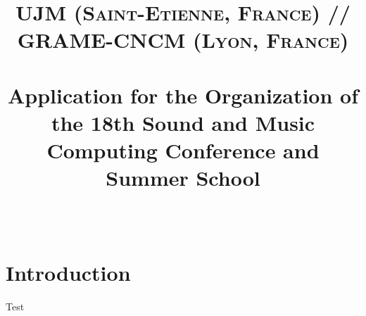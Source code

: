\documentclass[fontsize=12pt]{scrartcl} %
\title{	
\normalfont \normalsize 
\textsc{UJM (Saint-Etienne, France) // GRAME-CNCM (Lyon, France)} \\ [25pt] %
\horrule{0.5pt} \\[0.4cm] %
\huge Application for the Organization of the 18th Sound and Music Computing Conference and Summer School \\ %
\horrule{2pt} \\[0.5cm] %
}
\date{} %
\numberwithin{equation}{section} %
\numberwithin{figure}{section} %
\numberwithin{table}{section} %
\begin{document}
\maketitle %

\tableofcontents

\section{Introduction}

Test
\end{document}
